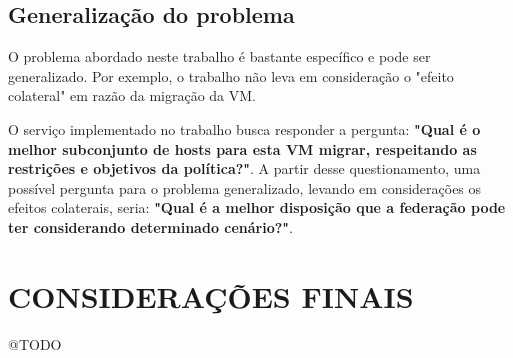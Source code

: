 \subsection{Generalização do problema}

O problema abordado neste trabalho é bastante específico e pode ser 
generalizado. Por exemplo, o trabalho não leva em consideração o "efeito colateral"
em razão da migração da VM.

O serviço implementado no trabalho busca responder a pergunta: 
\textbf{"Qual é o melhor subconjunto de hosts para esta VM migrar, respeitando as
restrições e objetivos da política?"}. A partir desse questionamento, uma possível
pergunta para o problema generalizado, levando em considerações os efeitos colaterais,
seria: \textbf{"Qual é a melhor disposição que a federação pode ter considerando
determinado cenário?"}.
 
\section{CONSIDERAÇÕES FINAIS}
@TODO